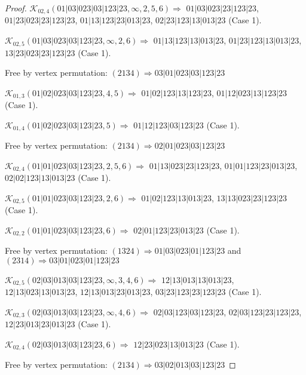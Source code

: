 \documentclass[12pt]{article}
\theoremstyle{plain}
\theoremstyle{definition}
\theoremstyle{remark}
\newcommand{\fancy}[1]{\mathcal{#1}}
\def\K{\fancy{K}}
\begin{document}
\begin{proof}
	
	
	\bigskip
	
	$\K_{02,4}(01|03|023|03|123|23,\infty,2, 5, 6)\Rightarrow $ $01|03|023|23|123|23$, $01|23|023|23|123|23$, $01|13|123|23|013|23$, $02|23|123|13|013|23$ (Case 1).
	
	$\K_{02,5}(01|03|023|03|123|23,\infty,2, 6)\Rightarrow $ $01|13|123|13|013|23$, $01|23|123|13|013|23$, $13|23|023|23|123|23$ (Case 1).
	
	
	
	Free by vertex permutation: $(2 1 3 4)\Rightarrow 03|01|023|03|123|23$
	
	
	
	\bigskip
	
	$\K_{01,3}(01|02|023|03|123|23,4, 5)\Rightarrow $ $01|02|123|13|123|23$, $01|12|023|13|123|23$ (Case 1).
	
	$\K_{01,4}(01|02|023|03|123|23,5)\Rightarrow $ $01|12|123|03|123|23$ (Case 1).
	
	
	
	Free by vertex permutation: $(2 1 3 4)\Rightarrow 02|01|023|03|123|23$
	
	
	
	\bigskip
	
	$\K_{02,4}(01|01|023|03|123|23,2, 5, 6)\Rightarrow $ $01|13|023|23|123|23$, $01|01|123|23|013|23$, $02|02|123|13|013|23$ (Case 1).
	
	$\K_{02,5}(01|01|023|03|123|23,2, 6)\Rightarrow $ $01|02|123|13|013|23$, $13|13|023|23|123|23$ (Case 1).
	
	$\K_{02,2}(01|01|023|03|123|23,6)\Rightarrow $ $02|01|123|23|013|23$ (Case 1).
	
	
	
	Free by vertex permutation: $(1 3 2 4)\Rightarrow 01|03|023|01|123|23$ and $(2 3 1 4)\Rightarrow 03|01|023|01|123|23$
	
	
	
	\bigskip
	
	$\K_{02,5}(02|03|013|03|123|23,\infty,3, 4, 6)\Rightarrow $ $12|13|013|13|013|23$, $12|13|023|13|013|23$, $12|13|013|23|013|23$, $03|23|123|23|123|23$ (Case 1).
	
	$\K_{02,3}(02|03|013|03|123|23,\infty,4, 6)\Rightarrow $ $02|03|123|03|123|23$, $02|03|123|23|123|23$, $12|23|013|23|013|23$ (Case 1).
	
	$\K_{02,4}(02|03|013|03|123|23,6)\Rightarrow $ $12|23|023|13|013|23$ (Case 1).
	
	
	
	Free by vertex permutation: $(2 1 3 4)\Rightarrow 03|02|013|03|123|23$
	

\end{proof}
\end{document}

